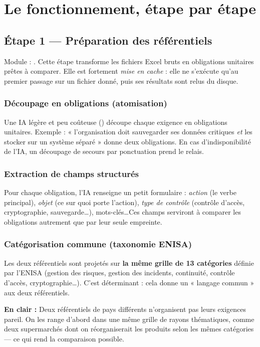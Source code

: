 \documentclass[11pt,a4paper]{report}
\newcommand{\code}[1]{\texttt{\detokenize{#1}}}
\newcommand{\enclair}[1]{\begin{plain}\textbf{En clair :} #1\end{plain}}
\begin{document}
\part{Le fonctionnement, étape par étape}

\chapter{Étape 1 --- Préparation des référentiels}

Module : \code{preprocessing.py}. Cette étape transforme les fichiers Excel bruts en obligations unitaires prêtes à comparer. Elle est fortement \emph{mise en cache} : elle ne s'exécute qu'au premier passage sur un fichier donné, puis ses résultats sont relus du disque.

\section{Découpage en obligations (atomisation)}
Une IA légère et peu coûteuse (\code{gpt-5.4-nano}) découpe chaque exigence en obligations unitaires. Exemple : « l'organisation doit sauvegarder ses données critiques \emph{et} les stocker sur un système séparé » donne deux obligations. En cas d'indisponibilité de l'IA, un découpage de secours par ponctuation prend le relais.

\section{Extraction de champs structurés}
Pour chaque obligation, l'IA renseigne un petit formulaire : \emph{action} (le verbe principal), \emph{objet} (ce sur quoi porte l'action), \emph{type de contrôle} (contrôle d'accès, cryptographie, sauvegarde\ldots), mots-clés\ldots Ces champs serviront à comparer les obligations autrement que par leur seule empreinte.

\section{Catégorisation commune (taxonomie ENISA)}
Les deux référentiels sont projetés sur \textbf{la même grille de 13 catégories} définie par l'ENISA (gestion des risques, gestion des incidents, continuité, contrôle d'accès, cryptographie\ldots). C'est déterminant : cela donne un « langage commun » aux deux référentiels.
\enclair{Deux référentiels de pays différents n'organisent pas leurs exigences pareil. On les range d'abord dans une même grille de rayons thématiques, comme deux supermarchés dont on réorganiserait les produits selon les mêmes catégories — ce qui rend la comparaison possible.}
\end{document}

